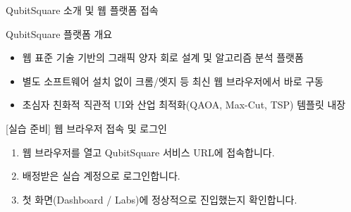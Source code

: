 \documentclass[aspectratio=169, 10pt]{beamer}
\begin{document}
\begin{frame}{QubitSquare 소개 및 웹 플랫폼 접속}
    \begin{qcblock}{QubitSquare 플랫폼 개요}
        \begin{itemize}
            \item 웹 표준 기술 기반의 그래픽 양자 회로 설계 및 알고리즘 분석 플랫폼
            \pause
            \item 별도 소프트웨어 설치 없이 크롬/엣지 등 최신 웹 브라우저에서 바로 구동
            \pause
            \item 초심자 친화적 직관적 UI와 산업 최적화(QAOA, Max-Cut, TSP) 템플릿 내장
        \end{itemize}
    \end{qcblock}
    \vspace{0.2cm}
    \begin{qctip}{[실습 준비] 웹 브라우저 접속 및 로그인}
        \begin{enumerate}
            \item 웹 브라우저를 열고 QubitSquare 서비스 URL에 접속합니다.
            \pause
            \item 배정받은 실습 계정으로 로그인합니다.
            \pause
            \item 첫 화면(Dashboard / Labs)에 정상적으로 진입했는지 확인합니다.
        \end{enumerate}
    \end{qctip}
\end{frame}
\end{document}
